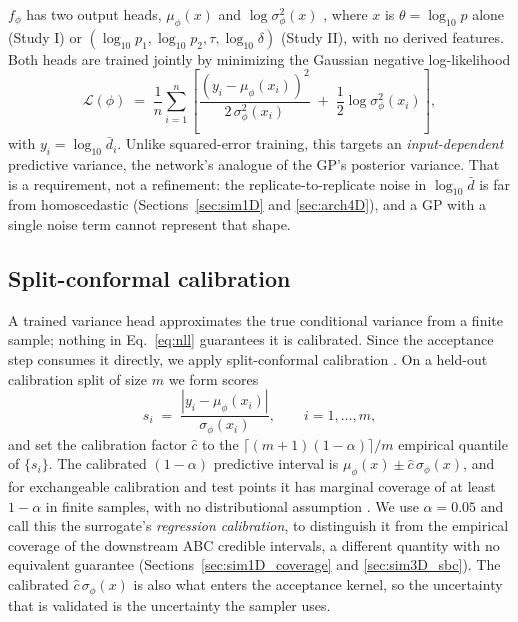 \documentclass[sn-basic,iicol,pdflatex]{sn-jnl}
\newcommand{\dbar}{\ensuremath{\bar d}}
\begin{document}
$f_\phi$ has two output heads, $\mu_\phi(x)$ and $\log\sigma^2_\phi(x)$ \citep{nix1994}, where
$x$ is $\theta=\log_{10}p$ alone (Study I) or $(\log_{10}p_1, \log_{10}p_2,
\tau, \log_{10}\delta)$ (Study II), with no derived features. Both heads are trained jointly by
minimizing the Gaussian negative log-likelihood
\begin{equation}
\label{eq:nll}
\mathcal{L}(\phi) \;=\; \frac{1}{n}\sum_{i=1}^n \left[
\frac{\left(y_i - \mu_\phi(x_i)\right)^2}{2\,\sigma_\phi^2(x_i)}
\;+\; \frac{1}{2}\log \sigma_\phi^2(x_i)
\right],
\end{equation}
with $y_i = \log_{10}\dbar_i$. Unlike squared-error training, this targets an
\emph{input-dependent} predictive variance, the network's analogue of the GP's
posterior variance. That is a requirement, not a refinement: the
replicate-to-replicate noise in $\log_{10}\dbar$ is far from homoscedastic
(Sections~\ref{sec:sim1D} and \ref{sec:arch4D}), and a GP with a single noise
term cannot represent that shape.

\subsection{Split-conformal calibration}
\label{sec:conformal}

A trained variance head approximates the true conditional variance from a
finite sample; nothing in Eq.~\eqref{eq:nll} guarantees it is calibrated. Since
the acceptance step consumes it directly, we apply split-conformal calibration
\citep{lei2018,vovk2022,angelopoulos2023}. On a held-out calibration split of size $m$ we form scores
\[
s_i \;=\; \frac{\left|y_i - \mu_\phi(x_i)\right|}{\sigma_\phi(x_i)}, \qquad i=1,\dots,m,
\]
and set the calibration factor $\hat c$ to the $\lceil (m+1)(1-\alpha)
\rceil / m$ empirical quantile of $\{s_i\}$. The calibrated $(1-\alpha)$
predictive interval is $\mu_\phi(x) \pm \hat c\, \sigma_\phi(x)$, and for
exchangeable calibration and test points it has marginal coverage of at least
$1-\alpha$ in finite samples, with no distributional assumption \citep{lei2018}.
We use $\alpha = 0.05$ and call this the surrogate's \emph{regression
calibration}, to distinguish it from the empirical coverage of the downstream
ABC credible intervals, a different quantity with no equivalent guarantee
(Sections~\ref{sec:sim1D_coverage} and \ref{sec:sim3D_sbc}). The calibrated
$\hat c\,\sigma_\phi(x)$ is also what enters the acceptance kernel, so the
uncertainty that is validated is the uncertainty the sampler uses.
\end{document}
